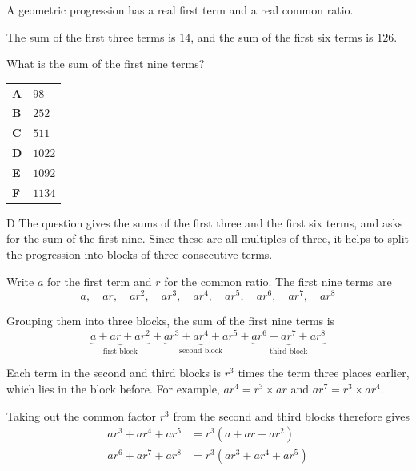 \documentclass[11pt,a4paper]{article}
\begin{document}
\begin{enumerate}[label=\textbf{\arabic*.},leftmargin=*,itemsep=0pt,start=6]
A geometric progression has a real first term and a real common ratio.

The sum of the first three terms is $14$, and the sum of the first six terms is $126$.

What is the sum of the first nine terms?

\par\vspace*{12pt}
\begin{tabularx}{\linewidth}{@{}>{\bfseries}l Y@{}}
A &
$98$
\\[0.8em]
B &
$252$
\\[0.8em]
C &
$511$
\\[0.8em]
D &
$1022$
\\[0.8em]
E &
$1092$
\\[0.8em]
F &
$1134$
\\
\end{tabularx}

\begin{djsSolution}{D}
The question gives the sums of the first three and the first six terms, and asks for the sum of the first nine. Since these are all multiples of three, it helps to split the progression into blocks of three consecutive terms.

Write $a$ for the first term and $r$ for the common ratio. The first nine terms are
\[
a,\quad ar,\quad ar^2,\quad ar^3,\quad ar^4,\quad ar^5,\quad ar^6,\quad ar^7,\quad ar^8
\]

Grouping them into three blocks, the sum of the first nine terms is
\[
\underbrace{a+ar+ar^2}_{\text{first block}}
+\underbrace{ar^3+ar^4+ar^5}_{\text{second block}}
+\underbrace{ar^6+ar^7+ar^8}_{\text{third block}}
\]

Each term in the second and third blocks is $r^3$ times the term three places earlier, which lies in the block before. For example, $ar^4=r^3\times ar$ and $ar^7=r^3\times ar^4$.

Taking out the common factor $r^3$ from the second and third blocks therefore gives
\[
\begin{aligned}
ar^3+ar^4+ar^5&=r^3\left(a+ar+ar^2\right)\\[5pt]
ar^6+ar^7+ar^8&=r^3\left(ar^3+ar^4+ar^5\right)
\end{aligned}
\]


\end{djsSolution}
\end{enumerate}
\end{document}
